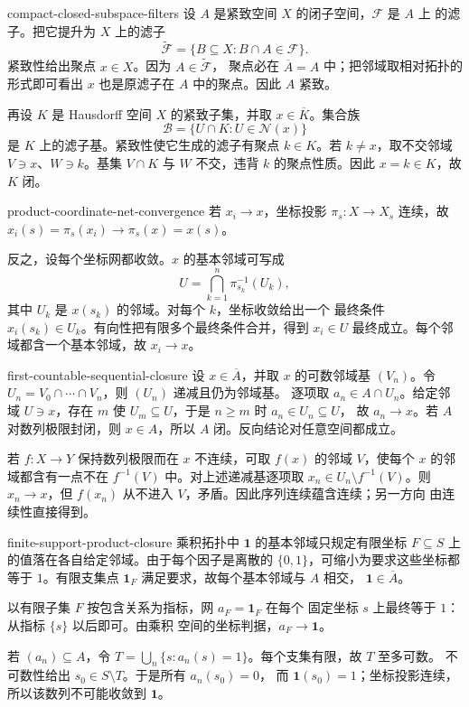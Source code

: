 \begin{solution}{compact-closed-subspace-filters}
设 \(A\) 是紧致空间 \(X\) 的闭子空间，\(\mathcal F\) 是 \(A\) 上
的滤子。把它提升为 \(X\) 上的滤子
\[
 \widetilde{\mathcal F}
 =\{B\subseteq X:B\cap A\in\mathcal F\}.
\]
紧致性给出聚点 \(x\in X\)。因为 \(A\in\widetilde{\mathcal F}\)，
聚点必在 \(\overline A=A\) 中；把邻域取相对拓扑的形式即可看出 \(x\)
也是原滤子在 \(A\) 中的聚点。因此 \(A\) 紧致。

再设 \(K\) 是 Hausdorff 空间 \(X\) 的紧致子集，并取
\(x\in\overline K\)。集合族
\[
 \mathcal B=\{U\cap K:U\in\mathcal N(x)\}
\]
是 \(K\) 上的滤子基。紧致性使它生成的滤子有聚点 \(k\in K\)。若
\(k\ne x\)，取不交邻域 \(V\ni x\)、\(W\ni k\)。基集
\(V\cap K\) 与 \(W\) 不交，违背 \(k\) 的聚点性质。因此
\(x=k\in K\)，故 \(K\) 闭。
\end{solution}

\begin{solution}{product-coordinate-net-convergence}
若 \(x_i\to x\)，坐标投影 \(\pi_s:X\to X_s\) 连续，故
\(x_i(s)=\pi_s(x_i)\to\pi_s(x)=x(s)\)。

反之，设每个坐标网都收敛。\(x\) 的基本邻域可写成
\[
 U=\bigcap_{k=1}^n\pi_{s_k}^{-1}(U_k),
\]
其中 \(U_k\) 是 \(x(s_k)\) 的邻域。对每个 \(k\)，坐标收敛给出一个
最终条件 \(x_i(s_k)\in U_k\)。有向性把有限多个最终条件合并，得到
\(x_i\in U\) 最终成立。每个邻域都含一个基本邻域，故 \(x_i\to x\)。
\end{solution}

\begin{solution}{first-countable-sequential-closure}
设 \(x\in\overline A\)，并取 \(x\) 的可数邻域基 \((V_n)\)。令
\(U_n=V_0\cap\cdots\cap V_n\)，则 \((U_n)\) 递减且仍为邻域基。
逐项取 \(a_n\in A\cap U_n\)。给定邻域 \(U\ni x\)，存在 \(m\) 使
\(U_m\subseteq U\)，于是 \(n\ge m\) 时 \(a_n\in U_n\subseteq U\)，
故 \(a_n\to x\)。若 \(A\) 对数列极限封闭，则 \(x\in A\)，所以
\(A\) 闭。反向结论对任意空间都成立。

若 \(f:X\to Y\) 保持数列极限而在 \(x\) 不连续，可取
\(f(x)\) 的邻域 \(V\)，使每个 \(x\) 的邻域都含有一点不在
\(f^{-1}(V)\) 中。对上述递减基逐项取
\(x_n\in U_n\setminus f^{-1}(V)\)。则 \(x_n\to x\)，但
\(f(x_n)\) 从不进入 \(V\)，矛盾。因此序列连续蕴含连续；另一方向
由连续性直接得到。
\end{solution}

\begin{solution}{finite-support-product-closure}
乘积拓扑中 \(\boldsymbol1\) 的基本邻域只规定有限坐标
\(F\subseteq S\) 上的值落在各自给定邻域。由于每个因子是离散的
\(\{0,1\}\)，可缩小为要求这些坐标都等于 \(1\)。有限支集点
\(\boldsymbol1_F\) 满足要求，故每个基本邻域与 \(A\) 相交，
\(\boldsymbol1\in\overline A\)。

以有限子集 \(F\) 按包含关系为指标，网 \(a_F=\boldsymbol1_F\) 在每个
固定坐标 \(s\) 上最终等于 \(1\)：从指标 \(\{s\}\) 以后即可。由乘积
空间的坐标判据，\(a_F\to\boldsymbol1\)。

若 \((a_n)\subseteq A\)，令
\(T=\bigcup_n\{s:a_n(s)=1\}\)。每个支集有限，故 \(T\) 至多可数。
不可数性给出 \(s_0\in S\setminus T\)。于是所有 \(a_n(s_0)=0\)，
而 \(\boldsymbol1(s_0)=1\)；坐标投影连续，所以该数列不可能收敛到
\(\boldsymbol1\)。
\end{solution}


